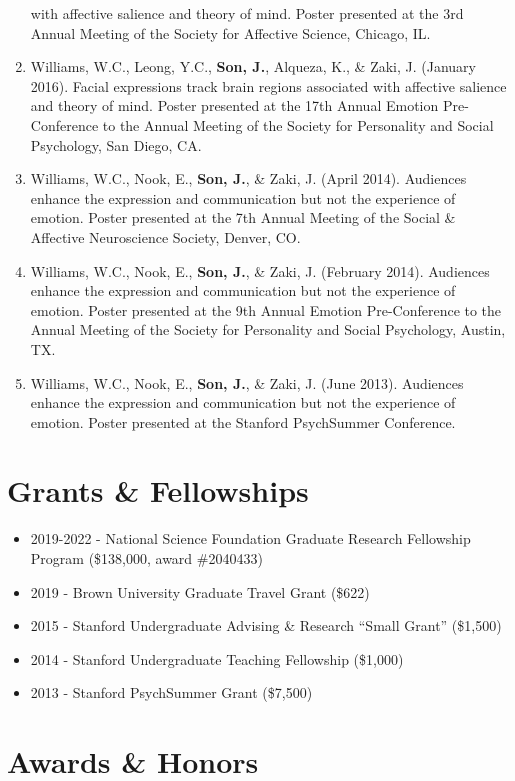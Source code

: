 \documentclass[
]{article}
\begin{document}
\begin{enumerate}
  with affective salience and theory of mind. Poster presented at the
  3rd Annual Meeting of the Society for Affective Science, Chicago, IL.
\item
  Williams, W.C., Leong, Y.C., \textbf{Son, J.}, Alqueza, K., \& Zaki,
  J. (January 2016). Facial expressions track brain regions associated
  with affective salience and theory of mind. Poster presented at the
  17th Annual Emotion Pre-Conference to the Annual Meeting of the
  Society for Personality and Social Psychology, San Diego, CA.
\item
  Williams, W.C., Nook, E., \textbf{Son, J.}, \& Zaki, J. (April 2014).
  Audiences enhance the expression and communication but not the
  experience of emotion. Poster presented at the 7th Annual Meeting of
  the Social \& Affective Neuroscience Society, Denver, CO.
\item
  Williams, W.C., Nook, E., \textbf{Son, J.}, \& Zaki, J. (February
  2014). Audiences enhance the expression and communication but not the
  experience of emotion. Poster presented at the 9th Annual Emotion
  Pre-Conference to the Annual Meeting of the Society for Personality
  and Social Psychology, Austin, TX.
\item
  Williams, W.C., Nook, E., \textbf{Son, J.}, \& Zaki, J. (June 2013).
  Audiences enhance the expression and communication but not the
  experience of emotion. Poster presented at the Stanford PsychSummer
  Conference.
\end{enumerate}

\hypertarget{grants-fellowships}{%
\section{Grants \& Fellowships}\label{grants-fellowships}}

\begin{itemize}
\item
  2019-2022 - National Science Foundation Graduate Research Fellowship
  Program (\$138,000, award \#2040433)
\item
  2019 - Brown University Graduate Travel Grant (\$622)
\item
  2015 - Stanford Undergraduate Advising \& Research ``Small Grant''
  (\$1,500)
\item
  2014 - Stanford Undergraduate Teaching Fellowship (\$1,000)
\item
  2013 - Stanford PsychSummer Grant (\$7,500)
\end{itemize}

\hypertarget{awards-honors}{%
\section{Awards \& Honors}\label{awards-honors}}
\end{document}
